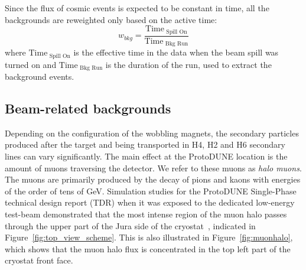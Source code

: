 Since the flux of cosmic events is expected to be constant in time, all the backgrounds are reweighted only based on the active time:
\begin{equation}
    w_{bkg}=\frac{\text{Time}_{\text{ Spill On}}}{\text{Time}_{\text{ Bkg Run}}}
\end{equation}
where ${\text{Time}_{\text{ Spill On}}}$ is the effective time in the data when the beam spill was turned on and ${\text{Time}_{\text{ Bkg Run}}}$ is the duration of the run, used to extract the background events.

\subsection{Beam-related backgrounds}

Depending on the configuration of the wobbling magnets, the secondary particles produced after the target and being transported in H4, H2 and H6 secondary lines can vary significantly. The main effect at the ProtoDUNE location is the amount of muons traversing the detector. We refer to these muons as {\it halo muons}. The muons are primarily produced by the decay of pions and kaons with energies of the order of tens of GeV. Simulation studies for the ProtoDUNE Single-Phase technical design report (TDR) when it was exposed to the dedicated low-energy test-beam demonstrated that the most intense region of the muon halo passes through the upper part of the Jura side of the cryostat~\cite{DUNE_SP_2017}, indicated in Figure~\ref{fig:top_view_scheme}. This is also illustrated in Figure~\ref{fig:muonhalo}, which shows that the muon halo flux is concentrated in the top left part of the cryostat front face.


